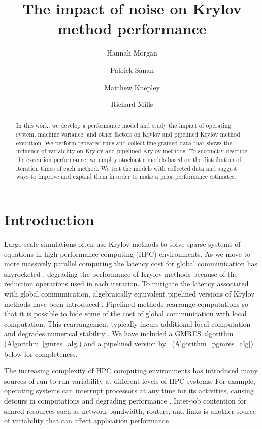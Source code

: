\documentclass[num-refs]{wiley-article}
\title{The impact of noise on Krylov method performance}
\author[1]{Hannah Morgan}
\author[2]{Patrick Sanan}
\author[3]{Matthew Knepley}
\author[1]{Richard Mills}
\affil[1]{Mathematics and Computer Science, Argonne National Laboratory, Argonne, Illinois, USA}
\affil[2]{Institute of Geophysics,  ETH Zurich,  Zurich, Switzerland}
\affil[3]{Computer Science in Engineering, University of Buffalo, Buffalo, New York, USA}
\begin{document}
\maketitle

\begin{abstract}
In this work, we develop a performance model and study the impact of 
operating system, machine variance, and other factors on Krylov and pipelined Krylov method execution.
We perform repeated runs and collect fine-grained data that 
 shows the influence of variability on Krylov and pipelined Krylov methods.
To succinctly describe the execution performance, we 
 employ stochastic models based on the distribution of iteration times of each method.
 We test the models with collected data and suggest ways to improve and expand them in order to make a prior performance estimates.
\end{abstract}

\section{Introduction}


Large-scale simulations often use Krylov methods \cite{saad96iterative} to solve sparse systems of equations in high performance computing (HPC) environments. 
As we move to more massively parallel computing the latency cost for global communication has skyrocketed \cite{HPCChallenge}, degrading the performance of Krylov methods because of the reduction operations used in each iteration.
To mitigate the latency associated with global communication, algebraically equivalent pipelined versions of Krylov methods have been introduced 
\cite{Chronopoulos_Gear_1989, Ghysels_Ashby_Meerbergen_Vanroose_2012, GhyselsVanroose2014, StrzodkaGoddeke06, Sturler_Vorst_1995, JacquesNicolasVollaire12}. 
Pipelined methods rearrange computations so that it is possible to hide some of the cost of global communication with local computation. 
This rearrangement typically incurs additional local computation and degrades numerical stability \cite{Cools2018, CarsonEtAl2018}. 
We have included a GMRES algorithm (Algorithm~\ref{gmres_alg}) and a pipelined version by~\cite{Ghysels_Ashby_Meerbergen_Vanroose_2012} (Algorithm~\ref{pgmres_alg}) below for completeness. 

The increasing complexity of HPC computing environments has introduced many sources of run-to-run variability at different levels of HPC systems. 
For example, operating systems can interrupt processors at any time for its activities, causing detours in computations and degrading performance \cite{hoefler2010characterizing, FerreiraBridgesBrightwell08}.
Inter-job contention for shared resources such as network bandwidth, routers, and links is another source of variability that can affect application performance \cite{parker2017early, chunduri2017run}. 
\end{document}
